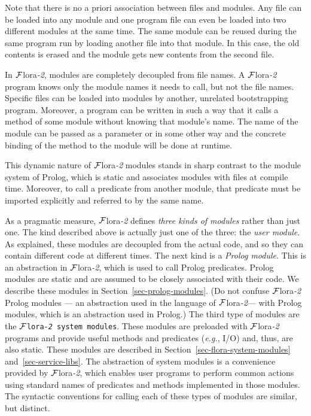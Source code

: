 \documentclass[11pt]{article}
\newcommand{\FLORA}{{\mbox{\sc ${\cal F}${lora}\rm\emph{-2}}}\xspace}
\begin{document}
Note that there is no a priori association between files and modules.  Any
file can be loaded into any module and one program file can even be loaded
into two different modules at the same time. The same module can be reused
during the same program run by loading another file into that module. In
this case, the old contents is erased and the module gets new contents from
the second file.

In \FLORA, modules are completely decoupled from file names. A \FLORA
program knows only the module names it needs to call, but not the file
names. Specific files can be loaded into modules by another, unrelated
bootstrapping program. Moreover, a program can be written in such a way
that it calls a method of some module without knowing that module's name.
The name of the module can be passed as a parameter or in some other way
and the concrete binding of the method to the module will be done at
runtime.

This dynamic nature of \FLORA modules stands in sharp contrast to the module
system of Prolog, which is static and associates modules with files at compile
time. Moreover, to call a predicate from another module, that predicate
must be imported explicitly and referred to by the same name.

As a pragmatic measure, \FLORA defines \emph{three kinds of modules} rather
than just one. The kind described above is actually just one of the three:
the \emph{user module}. As explained, these modules are decoupled from the
actual code, and so they can contain different code at different times.
The next kind is a \emph{Prolog module}. This is an abstraction in \FLORA,
which is used to call Prolog predicates. Prolog modules are static and are
assumed to be closely associated with their code. We describe these modules
in Section~\ref{sec-prolog-modules}. (Do not confuse \FLORA Prolog modules
--- an abstraction used in the language of \FLORA --- with Prolog modules,
which is an abstraction used in Prolog.)  The third type of modules are the
{\tt \FLORA system modules}. These modules are preloaded with \FLORA
programs and provide useful methods and predicates ({\it e.g.}, I/O) and,
thus, are also static. These modules are described in
Section~\ref{sec-flora-system-modules} and~\ref{sec-service-libs}. The
abstraction of system modules is a convenience provided by \FLORA, which
enables user programs to perform common actions using standard names of
predicates and methods implemented in those modules. The syntactic
conventions for calling each of these types of modules are similar, but
distinct.
\end{document}
